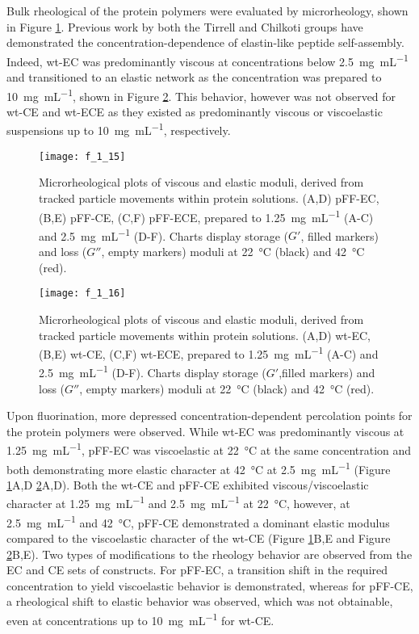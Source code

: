 \begin{refsection}
Bulk rheological of the protein polymers were evaluated by microrheology, shown
in Figure \ref{fig:pFF_rheology}. Previous work by both the Tirrell and Chilkoti
groups have demonstrated the concentration-dependence of elastin-like peptide
self-assembly.\cite{Meyer2004,Yamaoka2003} Indeed, wt-EC was predominantly
viscous at concentrations below \SI{2.5}{\mg\per\mL} and transitioned to an
elastic network as the concentration was prepared to \SI{10}{\mg\per\mL}, shown
in Figure \ref{fig:wt_rheology}.\cite{Haghpanah2010} This behavior, however was
not observed for wt-CE and wt-ECE as they existed as predominantly viscous or
viscoelastic suspensions up to \SI{10}{\mg\per\mL}, respectively.
\begin{figure}[h!] \centering \texttt{[image: f\_1\_15]}
    \caption{Microrheological plots of viscous and elastic moduli, derived from
    tracked particle movements within protein solutions. (A,D) pFF-EC, (B,E)
    pFF-CE, (C,F) pFF-ECE, prepared to \SI{1.25}{\mg\per\mL} (A-C) and
    \SI{2.5}{\mg\per\mL} (D-F). Charts display storage (${G'}$, filled markers) and loss
    (${G''}$, empty markers) moduli at \SI{22}{\celsius} (black) and \SI{42}{\celsius}
(red).} \label{fig:pFF_rheology} \end{figure}

\begin{figure}[h!] \centering \texttt{[image: f\_1\_16]}
    \caption{Microrheological plots of viscous and elastic moduli, derived from
    tracked particle movements within protein solutions. (A,D) wt-EC, (B,E)
    wt-CE, (C,F) wt-ECE, prepared to \SI{1.25}{\mg\per\mL} (A-C) and
    \SI{2.5}{\mg\per\mL} (D-F). Charts display storage (${G'}$,filled markers) and loss
    (${G''}$, empty markers) moduli at \SI{22}{\celsius} (black) and \SI{42}{\celsius}
(red).} \label{fig:wt_rheology} \end{figure}
Upon fluorination, more depressed concentration-dependent percolation points for
the protein polymers were observed. While wt-EC was predominantly viscous at
\SI{1.25}{\mg\per\mL}, pFF-EC was viscoelastic at \SI{22}{\celsius} at the same
concentration and both demonstrating more elastic character at \SI{42}{\celsius}
at \SI{2.5}{\mg\per\mL} (Figure \ref{fig:pFF_rheology}A,D
\ref{fig:wt_rheology}A,D). Both the wt-CE and pFF-CE exhibited
viscous/viscoelastic character at \SI{1.25}{\mg\per\mL} and \SI{2.5}{\mg\per\mL}
at \SI{22}{\celsius}, however, at \SI{2.5}{\mg\per\mL} and \SI{42}{\celsius},
pFF-CE demonstrated a dominant elastic modulus compared to the viscoelastic
character of the wt-CE (Figure \ref{fig:pFF_rheology}B,E and Figure
\ref{fig:wt_rheology}B,E). Two types of modifications to the rheology behavior
are observed from the EC and CE sets of constructs. For pFF-EC, a transition
shift in the required concentration to yield viscoelastic behavior is
demonstrated, whereas for pFF-CE, a rheological shift to elastic behavior was
observed, which was not obtainable, even at concentrations up to
\SI{10}{\mg\per\mL} for wt-CE.\cite{Haghpanah2010}


\end{refsection}
